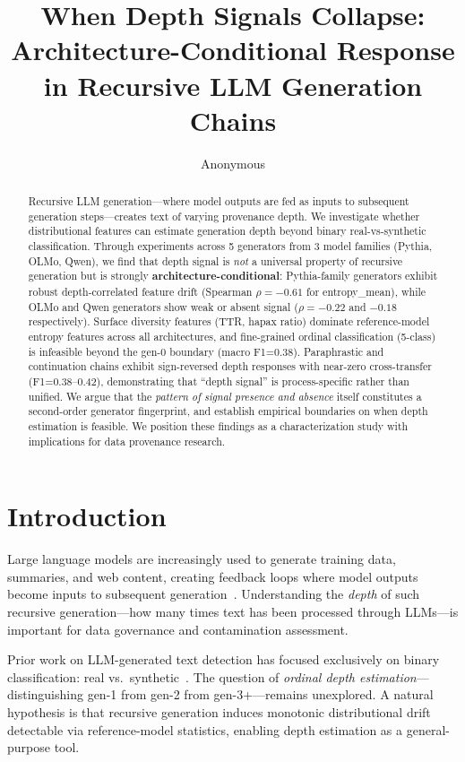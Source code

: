\documentclass[11pt,a4paper]{article}
\title{When Depth Signals Collapse: Architecture-Conditional Response\\in Recursive LLM Generation Chains}
\author{Anonymous}
\begin{document}
\maketitle

\begin{abstract}
Recursive LLM generation---where model outputs are fed as inputs to subsequent generation steps---creates text of varying provenance depth. We investigate whether distributional features can estimate generation depth beyond binary real-vs-synthetic classification. Through experiments across 5 generators from 3 model families (Pythia, OLMo, Qwen), we find that depth signal is \emph{not} a universal property of recursive generation but is strongly \textbf{architecture-conditional}: Pythia-family generators exhibit robust depth-correlated feature drift (Spearman $\rho=-0.61$ for entropy\_mean), while OLMo and Qwen generators show weak or absent signal ($\rho=-0.22$ and $-0.18$ respectively). Surface diversity features (TTR, hapax ratio) dominate reference-model entropy features across all architectures, and fine-grained ordinal classification (5-class) is infeasible beyond the gen-0 boundary (macro F1=0.38). Paraphrastic and continuation chains exhibit sign-reversed depth responses with near-zero cross-transfer (F1=0.38--0.42), demonstrating that ``depth signal'' is process-specific rather than unified. We argue that the \emph{pattern of signal presence and absence} itself constitutes a second-order generator fingerprint, and establish empirical boundaries on when depth estimation is feasible. We position these findings as a characterization study with implications for data provenance research.
\end{abstract}

\section{Introduction}

Large language models are increasingly used to generate training data, summaries, and web content, creating feedback loops where model outputs become inputs to subsequent generation~\cite{shumailov2024model,alemohammad2024selfconsuming}. Understanding the \emph{depth} of such recursive generation---how many times text has been processed through LLMs---is important for data governance and contamination assessment.

Prior work on LLM-generated text detection has focused exclusively on binary classification: real vs.\ synthetic~\cite{mitchell2023detectgpt,hans2024binoculars}. The question of \emph{ordinal depth estimation}---distinguishing gen-1 from gen-2 from gen-3+---remains unexplored. A natural hypothesis is that recursive generation induces monotonic distributional drift detectable via reference-model statistics, enabling depth estimation as a general-purpose tool.
\end{document}
